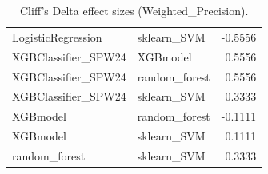 \begin{table}[t]
\begin{tabular}{llr}
LogisticRegression & sklearn_SVM & -0.5556 \\
XGBClassifier_SPW24 & XGBmodel & 0.5556 \\
XGBClassifier_SPW24 & random_forest & 0.5556 \\
XGBClassifier_SPW24 & sklearn_SVM & 0.3333 \\
XGBmodel & random_forest & -0.1111 \\
XGBmodel & sklearn_SVM & 0.1111 \\
random_forest & sklearn_SVM & 0.3333 \\
\bottomrule
\end{tabular}
\caption{Cliff's Delta effect sizes (Weighted_Precision).}
\label{tab:cliffs_Weighted_Precision}
\end{table}